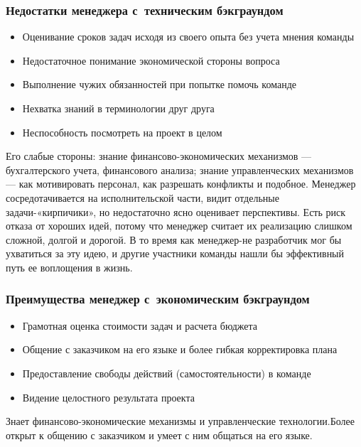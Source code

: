 \documentclass{../industrial-development}
\begin{document}
\begin{frame} \frametitle{Недостатки менеджера с~техническим бэкграундом}
	 \begin{itemize}
                      \item Оценивание сроков задач исходя из своего опыта без учета мнения команды
		\item Недостаточное понимание экономической стороны вопроса
		\item Выполнение чужих обязанностей при попытке помочь команде
		\item Нехватка знаний в терминологии друг друга
		\item Неспособность посмотреть на проект в целом
	\end{itemize} 	
\end{frame}
\lecturenotes
Его слабые стороны: знание финансово-экономических механизмов — бухгалтерского учета, финансового анализа; знание управленческих механизмов — как мотивировать персонал, как разрешать конфликты и подобное.
Менеджер сосредотачивается на исполнительской части, видит отдельные задачи-«кирпичики», но недостаточно ясно оценивает перспективы. 
Есть риск отказа от хороших идей, потому что менеджер считает их реализацию слишком сложной, долгой и дорогой. В то время как менеджер-не разработчик мог бы ухватиться за эту идею, и другие участники команды нашли бы эффективный путь ее воплощения в жизнь.


\begin{frame} \frametitle{Преимущества менеджер с~экономическим бэкграундом}
	 \begin{itemize}
                \item Грамотная оценка стоимости задач и расчета бюджета
		\item Общение с заказчиком на его языке и более гибкая корректировка плана
		\item Предоставление свободы действий (самостоятельности) в команде
		\item Видение целостного результата проекта
	\end{itemize} 	
\end{frame}
\lecturenotes
Знает финансово-экономические механизмы и управленческие технологии.Более открыт к общению с заказчиком и умеет с ним общаться на его языке.
\end{document}
